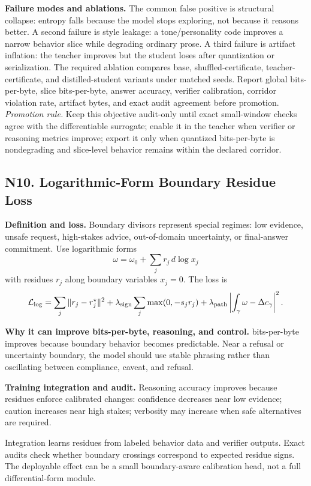 \documentclass[10pt]{article}
\newcommand{\loss}{\mathcal{L}}
\numberwithin{equation}{section}
\begin{document}
\noindent\textbf{Failure modes and ablations.} The common false positive is structural collapse: entropy falls because the model stops exploring, not because it reasons better. A second failure is style leakage: a tone/personality code improves a narrow behavior slice while degrading ordinary prose. A third failure is artifact inflation: the teacher improves but the student loses after quantization or serialization. The required ablation compares base, shuffled-certificate, teacher-certificate, and distilled-student variants under matched seeds. Report global bits-per-byte, slice bits-per-byte, answer accuracy, verifier calibration, corridor violation rate, artifact bytes, and exact audit agreement before promotion.
\vfill
\noindent\emph{Promotion rule.} Keep this objective audit-only until exact small-window checks agree with the differentiable surrogate; enable it in the teacher when verifier or reasoning metrics improve; export it only when quantized bits-per-byte is nondegrading and slice-level behavior remains within the declared corridor.
\clearpage
\subsection{N10. Logarithmic-Form Boundary Residue Loss}
\noindent\textbf{Definition and loss.} Boundary divisors represent special regimes: low evidence, unsafe request, high-stakes advice, out-of-domain uncertainty, or final-answer commitment. Use logarithmic forms
\[
\omega=\omega_0+\sum_j r_j\,d\log x_j
\]
with residues $r_j$ along boundary variables $x_j=0$. The loss is
\[
\loss_{\log}=\sum_j\|r_j-r_j^\star\|^2+\lambda_{\rm sign}\sum_j\max(0,-s_j r_j)+\lambda_{\rm path}\left|\int_{\gamma}\omega-\Delta c_\gamma\right|^2.
\]

\noindent\textbf{Why it can improve bits-per-byte, reasoning, and control.} bits-per-byte improves because boundary behavior becomes predictable. Near a refusal or uncertainty boundary, the model should use stable phrasing rather than oscillating between compliance, caveat, and refusal.

\noindent\textbf{Training integration and audit.} Reasoning accuracy improves because residues enforce calibrated changes: confidence decreases near low evidence; caution increases near high stakes; verbosity may increase when safe alternatives are required.

Integration learns residues from labeled behavior data and verifier outputs. Exact audits check whether boundary crossings correspond to expected residue signs. The deployable effect can be a small boundary-aware calibration head, not a full differential-form module.
\end{document}
